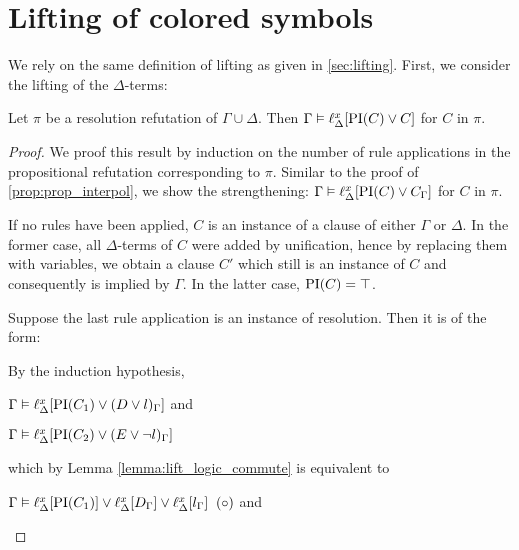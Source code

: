 \section{Lifting of colored symbols}

We rely on the same definition of lifting as given in \ref{sec:lifting}.
First, we consider the lifting of the $\Delta$-terms:\nopagebreak[4]

\begin{lemma}
	\label{lemma:gamma_entails_lifted_interpolantHuang}
	Let $\pi$ be a resolution refutation of $\Gamma \cup \Delta$. 
	Then $\Gamma \entails \lift{\Delta}{ \PI(C) \lor C }{x} $ for $C$ in $\pi$.
\end{lemma}
\begin{proof}
	We proof this result by induction on the number of rule applications in the propositional refutation corresponding to $\pi$. 
	Similar to the proof of \ref{prop:prop_interpol}, we show the strengthening:
	$\Gamma \entails \lift{\Delta}{ \PI(C) \lor C_\Gamma }{x} $ for $C$ in $\pi$.

	\begin{indproof}

			\newcommand{\lif}[1]{\lift{\Delta}{#1}{x}}

			If no rules have been applied, $C$ is an instance of a clause of either $\Gamma$ or $\Delta$.
			In the former case, all $\Delta$-terms of $C$ were added by unification, hence by replacing them with variables, we obtain a clause $C'$ which still is an instance of $C$ and consequently is implied by $\Gamma$. 
			In the latter case, $\PI(C) = \top$. 

		 Suppose the last rule application is an instance of resolution. Then it is of the form:
			\begin{prooftree}
			\end{prooftree}

			By the induction hypothesis,

			$\Gamma \entails \lift{\Delta}{ \PI(C_1) \lor (D \lor l)_\Gamma }{x}$ and

			$\Gamma \entails \lift{\Delta}{ \PI(C_2) \lor (E \lor \lnot l)_\Gamma }{x}$

			which by Lemma \ref{lemma:lift_logic_commute} is equivalent to

			$\Gamma \entails \lift{\Delta}{ \PI(C_1) }{x} \lor
			\lift{\Delta}{ D_\Gamma }{x} \lor
			\lift{\Delta}{ l_\Gamma }{x} \;\; {(\circ)} $
			and


\end{indproof}
\end{proof}
